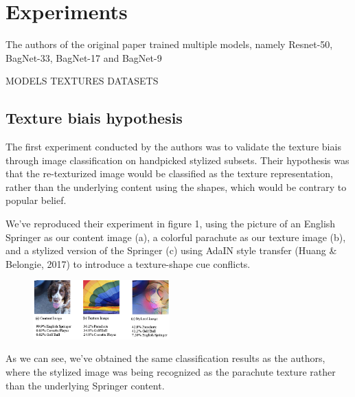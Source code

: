 \documentclass{article}
\begin{document}
\newpage
\section{Experiments}

The authors of the original paper trained multiple models, 
namely Resnet-50, BagNet-33, BagNet-17 and BagNet-9

MODELS
TEXTURES
DATASETS



\subsection{Texture biais hypothesis}

The first experiment conducted by the authors was to validate the texture biais 
through image classification on handpicked stylized subsets. 
Their hypothesis was that the re-texturized image would be classified as the texture representation, rather than 
the underlying content using the shapes, which would be contrary to popular belief. \smallskip

\noindent
We've reproduced their experiment in figure 1, %
using the picture of an English Springer as our content image (a), 
a colorful parachute as our texture image (b),
and a stylized version of the Springer (c) using AdaIN style transfer 
(Huang \& Belongie, 2017) %
to introduce a texture-shape cue conflicts.

\begin{figure}[h!]\center
  \includegraphics[width=0.47\textwidth]{imgs/results-textures}
\end{figure}

\noindent
As we can see, we've obtained the same classification results as the authors, 
where the stylized image was being recognized as the parachute texture
rather than the underlying Springer content.
\end{document}
